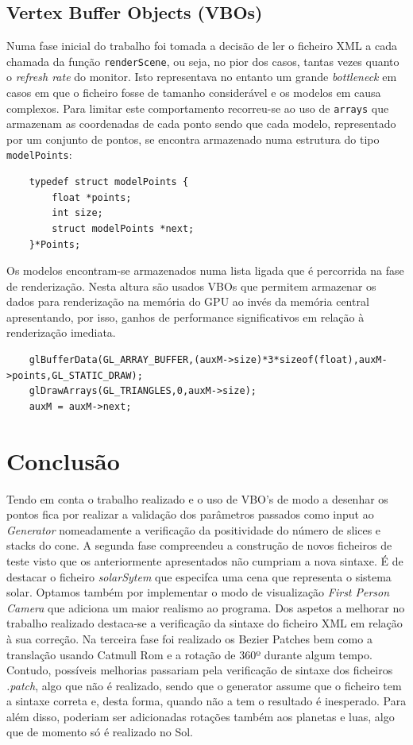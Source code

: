 \documentclass{article}
\begin{document}
\subsection{Vertex Buffer Objects (VBOs)}
Numa fase inicial do trabalho foi tomada a decisão de ler o ficheiro XML a cada chamada da função \texttt{renderScene}, ou seja, no pior dos casos, tantas vezes quanto o \textit{refresh rate} do monitor. Isto representava no entanto um grande \textit{bottleneck} em casos em que o ficheiro fosse de tamanho considerável e os modelos em causa complexos. Para limitar este comportamento recorreu-se ao uso de \texttt{arrays} que armazenam as coordenadas de cada ponto sendo que cada modelo, representado por um conjunto de pontos, se encontra armazenado numa estrutura do tipo \texttt{modelPoints}:
\begin{Verbatim}
    typedef struct modelPoints {
        float *points;
        int size;
        struct modelPoints *next;
    }*Points;
\end{Verbatim}
Os modelos encontram-se armazenados numa lista ligada que é percorrida na fase de renderização. Nesta altura são usados VBOs que permitem armazenar os dados para renderização na memória do GPU ao invés da memória central apresentando, por isso, ganhos de performance significativos em relação à renderização imediata.

\begin{Verbatim}
    glBufferData(GL_ARRAY_BUFFER,(auxM->size)*3*sizeof(float),auxM->points,GL_STATIC_DRAW);
    glDrawArrays(GL_TRIANGLES,0,auxM->size);
    auxM = auxM->next;
\end{Verbatim}


\newpage

\section{Conclusão}
Tendo em conta o trabalho realizado e o uso de VBO's de modo a desenhar os pontos fica por realizar a validação dos parâmetros passados como input ao \textit{Generator} nomeadamente a verificação da positividade do número de slices e stacks do cone. 
A segunda fase compreendeu a construção de novos ficheiros de teste visto que os anteriormente apresentados não cumpriam a nova sintaxe. É de destacar o ficheiro \textit{solarSytem} que especifca uma cena que representa o sistema solar. Optamos também por implementar o modo de visualização \textit{First Person Camera} que adiciona um maior realismo ao programa. Dos aspetos a melhorar no trabalho realizado destaca-se a verificação da sintaxe do ficheiro XML em relação à sua correção. 
Na terceira fase foi realizado os Bezier Patches bem como a translação usando Catmull Rom e a rotação de 360º durante algum tempo. Contudo, possíveis melhorias passariam pela verificação de sintaxe dos ficheiros \textit{.patch}, algo que não é realizado, sendo que o generator assume que o ficheiro tem a sintaxe correta e, desta forma, quando não a tem o resultado é inesperado. Para além disso, poderiam ser adicionadas rotações também aos planetas e luas, algo que de momento só é realizado no Sol.
\end{document}
